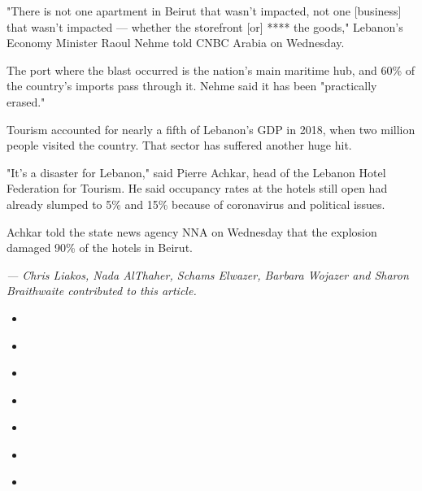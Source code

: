 "There is not one apartment in Beirut that wasn't impacted, not one
{[}business{]} that wasn't impacted --- whether the storefront {[}or{]}
**** the goods," Lebanon's Economy Minister Raoul Nehme told CNBC Arabia
on Wednesday.

The port where the blast occurred is the nation's main maritime hub, and
60\% of the country's imports pass through it. Nehme said it has been
"practically erased."

Tourism accounted for nearly a fifth of Lebanon's GDP in 2018, when two
million people visited the country. That sector has suffered another
huge hit.

"It's a disaster for Lebanon," said Pierre Achkar, head of the Lebanon
Hotel Federation for Tourism. He said occupancy rates at the hotels
still open had already slumped to 5\% and 15\% because of coronavirus
and political issues.

Achkar told the state news agency NNA on Wednesday that the explosion
damaged 90\% of the hotels in Beirut.

\emph{--- Chris Liakos, Nada AlThaher, Schams Elwazer, Barbara Wojazer
and Sharon Braithwaite contributed to this article.}

\begin{itemize}
\item
\end{itemize}

\begin{itemize}
\item
\end{itemize}

\begin{itemize}
\item
\end{itemize}

\begin{itemize}
\item
\end{itemize}

\begin{itemize}
\item
\end{itemize}

\begin{itemize}
\item
\end{itemize}

\begin{itemize}
\item
\end{itemize}

